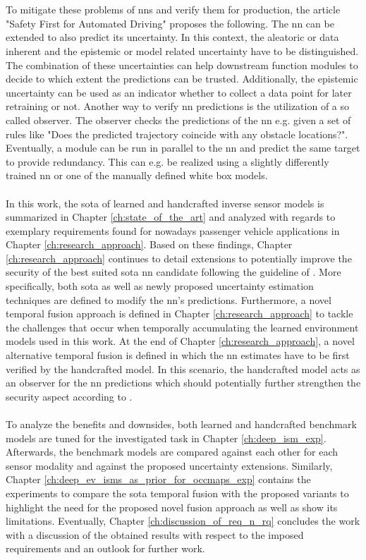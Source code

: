 \\\\
To mitigate these problems of \gls{nn}s and verify them for production, the article "Safety First for Automated Driving" \cite{safetyfirst2019} proposes the following. The \gls{nn} can be extended to also predict its uncertainty. In this context, the aleatoric or data inherent and the epistemic or model related uncertainty have to be distinguished. The combination of these uncertainties can help downstream function modules to decide to which extent the predictions can be trusted. Additionally, the epistemic uncertainty can be used as an indicator whether to collect a data point for later retraining or not. Another way to verify \gls{nn} predictions is the utilization of a so called observer. The observer checks the predictions of the \gls{nn} e.g. given a set of rules like "Does the predicted trajectory coincide with any obstacle locations?". Eventually, a module can be run in parallel to the \gls{nn} and predict the same target to provide redundancy. This can e.g. be realized using a slightly differently trained \gls{nn} or one of the manually defined white box models.
\\\\
In this work, the \gls{sota} of learned and handcrafted inverse sensor models is summarized in Chapter \ref{ch:state_of_the_art} and analyzed with regards to exemplary requirements found for nowadays passenger vehicle applications in Chapter \ref{ch:research_approach}. Based on these findings, Chapter \ref{ch:research_approach} continues to detail extensions to potentially improve the security of the best suited \gls{sota} \gls{nn} candidate following the guideline of \cite{safetyfirst2019}. More specifically, both \gls{sota} as well as newly proposed uncertainty estimation techniques are defined to modify the \gls{nn}'s predictions. Furthermore, a novel temporal fusion approach is defined in Chapter \ref{ch:research_approach} to tackle the challenges that occur when temporally accumulating the learned environment models used in this work. At the end of Chapter \ref{ch:research_approach}, a novel alternative temporal fusion is defined in which the \gls{nn} estimates have to be first verified by the handcrafted model. In this scenario, the handcrafted model acts as an observer for the \gls{nn} predictions which should potentially further strengthen the security aspect according to \cite{safetyfirst2019}.
\\\\
To analyze the benefits and downsides, both learned and handcrafted benchmark models are tuned for the investigated task in Chapter \ref{ch:deep_ism_exp}. Afterwards, the benchmark models are compared against each other for each sensor modality and against the proposed uncertainty extensions. Similarly, Chapter \ref{ch:deep_ev_isms_as_prior_for_occmaps_exp} contains the experiments to compare the \gls{sota} temporal fusion with the proposed variants to highlight the need for the proposed novel fusion approach as well as show its limitations. Eventually, Chapter \ref{ch:discussion_of_req_n_rq} concludes the work with a discussion of the obtained results with respect to the imposed requirements and an outlook for further work.

